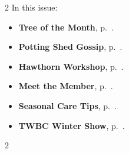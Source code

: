 \setlength{\columnsep}{-5.0cm}
\begin{multicols}{2}
    \noindent\textsf{In this issue:}
    \begin{itemize}
        \item \textsf{\textbf{Tree of the Month}}, p.~\pageref{2025-02-contest}.
        \item \textsf{\textbf{Potting Shed Gossip}}, p.~\pageref{2025-02-gossip}.
        \item \textsf{\textbf{Hawthorn Workshop}}, p.~\pageref{2025-02-hawthorn}.
        \item \textsf{\textbf{Meet the Member}}, p.~\pageref{2025-02-roots}.
        \item \textsf{\textbf{Seasonal Care Tips}}, p.~\pageref{2025-02-care}.
        \item \textsf{\textbf{TWBC Winter Show}}, p.~\pageref{2025-02-winter}.
    \end{itemize}
    \vfill\null
    \columnbreak

    
\end{multicols}
\pagebreak

\setlength{\columnsep}{0.5cm}
\begin{multicols}{2}
    
    
    
    
    
%    
%    
    
\end{multicols}
